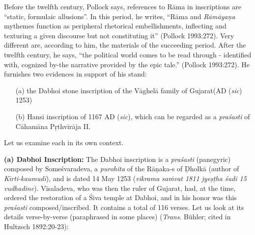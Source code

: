 Before the twelfth century, Pollock says, references to Rāma in inscriptions are “static, formulaic allusions”. In this period, he writes, “Rāma and {\sl Rāmāyaṇa} mythemes function as peripheral rhetorical embellishments, inflecting and texturing a given discourse but not constituting it” (Pollock 1993:272). Very different are, according to him, the materials of the succeeding period. After the twelfth century, he says, “the political world comes to be read through - identified with, cognized by-the narrative provided by the epic tale.” (Pollock 1993:272). He furnishes two evidences in support of his stand: 
\begin{itemize}
\itemsep=0pt
\item[(a)] the Dabhoi stone inscription of the Vāghelā family of Gujarat\break (AD ({\sl sic}) 1253) 
\item[(b)] Hansi inscription of 1167 AD ({\sl sic}), which can be regarded as a {\sl praśasti} of Cāhamāna Pṛthvīrāja II. 
\end{itemize}
Let us examine each in its own context. 

\smallskip
\noindent
{\bf (a) Dabhoi Inscription:} The Dabhoi inscription is a {\sl praśasti} (panegyric) composed by Someśvaradeva, a {\sl purohita} of the Rāṇaka-s of Ḍholkā (author of {\sl Kīrti-kaumudī}), and is dated 14 May 1253 ({\sl vikrama saṁvat 1811 jyeṣṭha śudi 15 vudhadine}). Vīsaladeva, who was then the ruler of Gujarat, had, at the time, ordered the restoration of a Śiva temple at Dabhoi, and in his honor was this {\sl praśasti} composed/inscribed. It contains a total of 116 verses. Let us look at its details verse-by-verse (paraphrased in some places) ({\sl Trans}. Bühler; cited in Hultzsch 1892:20-23):

